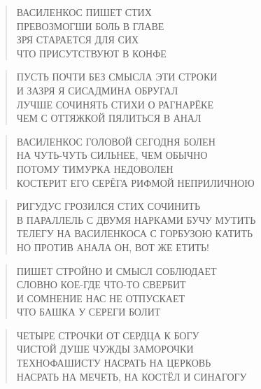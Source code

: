 \poemtitle{***}
\begin{verse}
ВАСИЛЕНКОС ПИШЕТ СТИХ\\
ПРЕВОЗМОГШИ БОЛЬ В ГЛАВЕ\\
ЗРЯ СТАРАЕТСЯ ДЛЯ СИХ\\
ЧТО ПРИСУТСТВУЮТ В КОНФЕ
\end{verse}

\poemtitle{***}
\begin{verse}
ПУСТЬ ПОЧТИ БЕЗ СМЫСЛА ЭТИ СТРОКИ\\
И ЗАЗРЯ Я СИСАДМИНА ОБРУГАЛ\\
ЛУЧШЕ СОЧИНЯТЬ СТИХИ О РАГНАРЁКЕ\\
ЧЕМ С ОТТЯЖКОЙ ПЯЛИТЬСЯ В АНАЛ
\end{verse}

\poemtitle{***}
\begin{verse}
ВАСИЛЕНКОС ГОЛОВОЙ СЕГОДНЯ БОЛЕН\\
НА ЧУТЬ-ЧУТЬ СИЛЬНЕЕ, ЧЕМ ОБЫЧНО\\
ПОТОМУ ТИМУРКА НЕДОВОЛЕН\\
КОСТЕРИТ ЕГО СЕРЁГА РИФМОЙ НЕПРИЛИЧНОЮ
\end{verse}

\poemtitle{***}
\begin{verse}
РИГУДУС ГРОЗИЛСЯ СТИХ СОЧИНИТЬ\\
В ПАРАЛЛЕЛЬ С ДВУМЯ НАРКАМИ БУЧУ МУТИТЬ\\
ТЕЛЕГУ НА ВАСИЛЕНКОСА С ГОРБУЗОЮ КАТИТЬ\\
НО ПРОТИВ АНАЛА ОН, ВОТ ЖЕ ЕТИТЬ!
\end{verse}

\poemtitle{***}
\begin{verse}
ПИШЕТ СТРОЙНО И СМЫСЛ СОБЛЮДАЕТ\\
СЛОВНО КОЕ-ГДЕ ЧТО-ТО СВЕРБИТ\\
И СОМНЕНИЕ НАС НЕ ОТПУСКАЕТ\\
ЧТО БАШКА У СЕРЕГИ БОЛИТ
\end{verse}

\poemtitle{***}
\begin{verse}
ЧЕТЫРЕ СТРОЧКИ ОТ СЕРДЦА К БОГУ\\
ЧИСТОЙ ДУШЕ ЧУЖДЫ ЗАМОРОЧКИ\\
ТЕХНОФАШИСТУ НАСРАТЬ НА ЦЕРКОВЬ\\
НАСРАТЬ НА МЕЧЕТЬ, НА КОСТЁЛ И СИНАГОГУ
\end{verse}

